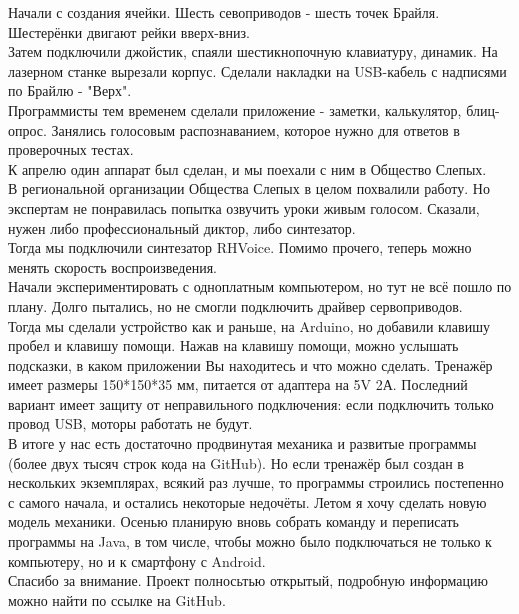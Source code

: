 \documentclass[a4paper,12pt]{article} %
\begin{document}
Начали с создания ячейки. Шесть севоприводов - шесть точек Брайля. Шестерёнки двигают рейки вверх-вниз. \\ %
Затем подключили джойстик, спаяли шестикнопочную клавиатуру, динамик. На лазерном станке вырезали корпус. Сделали накладки на USB-кабель с надписями по Брайлю - "Верх".\\ %
Программисты тем временем сделали приложение - заметки, калькулятор, блиц-опрос. Занялись голосовым распознаванием, которое нужно для ответов в проверочных тестах. \\ %
К апрелю один аппарат был сделан, и мы поехали с ним в Общество Слепых. \\ %
В региональной организации Общества Слепых в целом похвалили работу. Но экспертам не понравилась попытка озвучить уроки живым голосом. Сказали, нужен либо профессиональный диктор, либо синтезатор. \\ %
Тогда мы подключили синтезатор RHVoice. Помимо прочего, теперь можно менять скорость воспроизведения.\\ %
Начали экспериментировать с одноплатным компьютером, но тут не всё пошло по плану. Долго пытались, но не смогли подключить драйвер сервоприводов.\\ %
Тогда мы сделали устройство как и раньше, на Arduino, но добавили клавишу пробел и клавишу помощи. Нажав на клавишу помощи, можно услышать подсказки, в каком приложении Вы находитесь и что можно сделать.
Тренажёр имеет размеры 150*150*35 мм, питается от адаптера на 5V 2А. Последний вариант имеет защиту от неправильного подключения: если подключить только провод USB, моторы работать не будут. \\ %
В итоге у нас есть достаточно продвинутая механика и развитые программы (более двух тысяч строк кода на GitHub). Но если тренажёр был создан в нескольких экземплярах, всякий раз лучше, то программы строились постепенно с самого начала, и остались некоторые недочёты. Летом я хочу сделать новую модель механики. Осенью планирую вновь собрать команду и переписать программы на Java, в том числе, чтобы можно было подключаться не только к компьютеру, но и к смартфону с Android.\\ %
Спасибо за внимание. Проект полносьтью открытый, подробную информацию можно найти по ссылке на GitHub. \\ %
\end{document}
